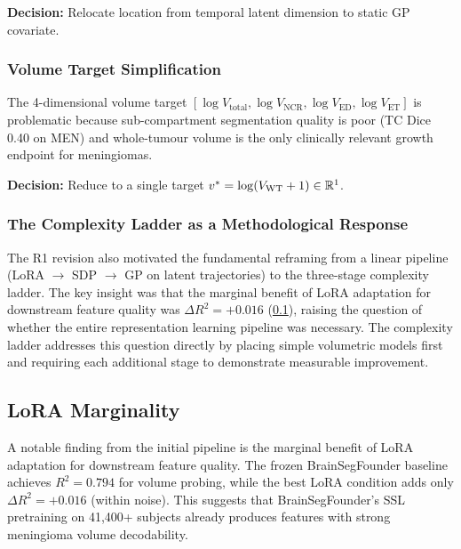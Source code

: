 \textbf{Decision:} Relocate location from temporal latent dimension to
static GP covariate.

\subsubsection{Volume Target Simplification}

The 4-dimensional volume target $[\log V_{\text{total}}, \log V_{\text{NCR}},
\log V_{\text{ED}}, \log V_{\text{ET}}]$ is problematic because sub-compartment
segmentation quality is poor (TC Dice 0.40 on MEN) and whole-tumour volume
is the only clinically relevant growth endpoint for meningiomas.

\textbf{Decision:} Reduce to a single target
$v^* = \log(V_{\text{WT}} + 1) \in \mathbb{R}^1$.

\subsubsection{The Complexity Ladder as a Methodological Response}

The R1 revision also motivated the fundamental reframing from a linear
pipeline (LoRA $\to$ SDP $\to$ GP on latent trajectories) to the three-stage
complexity ladder. The key insight was that the marginal benefit of LoRA
adaptation for downstream feature quality was $\Delta R^2 = +0.016$
(\cref{sec:eval:marginality}), raising the question of whether the entire
representation learning pipeline was necessary. The complexity ladder
addresses this question directly by placing simple volumetric models first
and requiring each additional stage to demonstrate measurable improvement.

\subsection{LoRA Marginality}
\label{sec:eval:marginality}

A notable finding from the initial pipeline is the marginal benefit of LoRA
adaptation for downstream feature quality. The frozen BrainSegFounder
baseline achieves $R^2 = 0.794$ for volume probing, while the best LoRA
condition adds only $\Delta R^2 = +0.016$ (within noise). This suggests that
BrainSegFounder's SSL pretraining on 41,400+ subjects already produces
features with strong meningioma volume decodability.

